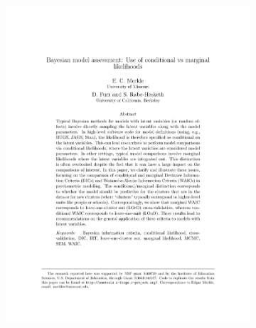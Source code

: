 \begin{figure}[!htbp]
    \centering
      \begin{subfigure}[b]{0.24\textwidth}
        \includegraphics[width=\textwidth]{images/chapter3/formatted_sample1.pdf}
      \end{subfigure}
      \hfill
      \begin{subfigure}[b]{0.24\textwidth}

\end{subfigure}
\end{figure}
